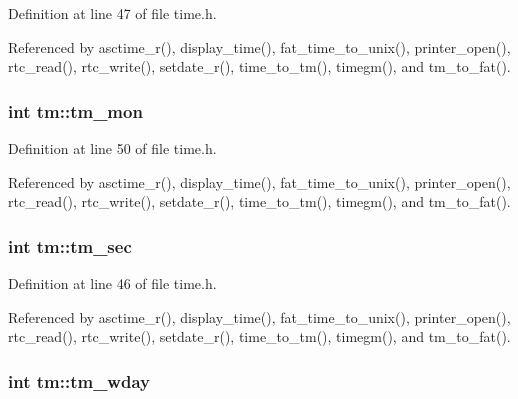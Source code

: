 Definition at line 47 of file time.\-h.



Referenced by asctime\-\_\-r(), display\-\_\-time(), fat\-\_\-time\-\_\-to\-\_\-unix(), printer\-\_\-open(), rtc\-\_\-read(), rtc\-\_\-write(), setdate\-\_\-r(), time\-\_\-to\-\_\-tm(), timegm(), and tm\-\_\-to\-\_\-fat().

\hypertarget{structtm_a112ac36fa2f593777138a417cf031e17}{
\subsubsection[{tm\-\_\-mon}]{\setlength{\rightskip}{0pt plus 5cm}int tm\-::tm\-\_\-mon}}\label{structtm_a112ac36fa2f593777138a417cf031e17}


Definition at line 50 of file time.\-h.



Referenced by asctime\-\_\-r(), display\-\_\-time(), fat\-\_\-time\-\_\-to\-\_\-unix(), printer\-\_\-open(), rtc\-\_\-read(), rtc\-\_\-write(), setdate\-\_\-r(), time\-\_\-to\-\_\-tm(), timegm(), and tm\-\_\-to\-\_\-fat().

\hypertarget{structtm_a4d098a9a5c03a00b2ee61e10851de81e}{
\subsubsection[{tm\-\_\-sec}]{\setlength{\rightskip}{0pt plus 5cm}int tm\-::tm\-\_\-sec}}\label{structtm_a4d098a9a5c03a00b2ee61e10851de81e}


Definition at line 46 of file time.\-h.



Referenced by asctime\-\_\-r(), display\-\_\-time(), fat\-\_\-time\-\_\-to\-\_\-unix(), printer\-\_\-open(), rtc\-\_\-read(), rtc\-\_\-write(), setdate\-\_\-r(), time\-\_\-to\-\_\-tm(), timegm(), and tm\-\_\-to\-\_\-fat().

\hypertarget{structtm_afe81a8c46f1c693c43f259b288859f4f}{
\subsubsection[{tm\-\_\-wday}]{\setlength{\rightskip}{0pt plus 5cm}int tm\-::tm\-\_\-wday}}\label{structtm_afe81a8c46f1c693c43f259b288859f4f}


